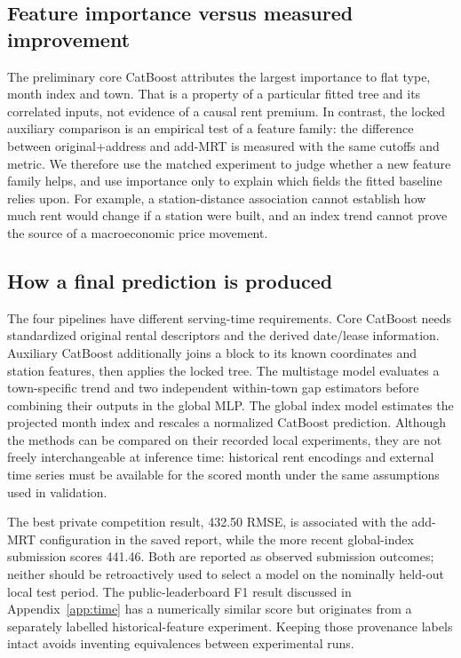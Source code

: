 \documentclass[10pt,a4paper]{article}
\begin{document}
\subsection{Feature importance versus measured improvement}
The preliminary core CatBoost attributes the largest importance to flat type, month index and town. That is a property of a particular fitted tree and its correlated inputs, not evidence of a causal rent premium. In contrast, the locked auxiliary comparison is an empirical test of a feature family: the difference between original+address and add-MRT is measured with the same cutoffs and metric. We therefore use the matched experiment to judge whether a new feature family helps, and use importance only to explain which fields the fitted baseline relies upon. For example, a station-distance association cannot establish how much rent would change if a station were built, and an index trend cannot prove the source of a macroeconomic price movement.

\subsection{How a final prediction is produced}
The four pipelines have different serving-time requirements. Core CatBoost needs standardized original rental descriptors and the derived date/lease information. Auxiliary CatBoost additionally joins a block to its known coordinates and station features, then applies the locked tree. The multistage model evaluates a town-specific trend and two independent within-town gap estimators before combining their outputs in the global MLP. The global index model estimates the projected month index and rescales a normalized CatBoost prediction. Although the methods can be compared on their recorded local experiments, they are not freely interchangeable at inference time: historical rent encodings and external time series must be available for the scored month under the same assumptions used in validation.

The best private competition result, 432.50 RMSE, is associated with the add-MRT configuration in the saved report, while the more recent global-index submission scores 441.46. Both are reported as observed submission outcomes; neither should be retroactively used to select a model on the nominally held-out local test period. The public-leaderboard F1 result discussed in Appendix~\ref{app:time} has a numerically similar score but originates from a separately labelled historical-feature experiment. Keeping those provenance labels intact avoids inventing equivalences between experimental runs.
\end{document}
